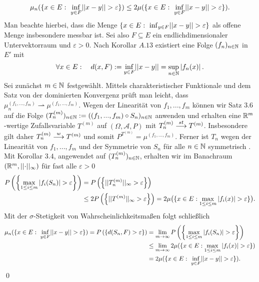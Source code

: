 \begin{proof*}
    $$
        \mu_n(\{x \in E: \ \inf_{y \in F}\lvert\lvert x-y \rvert\rvert > \varepsilon \}) \leq 2 \mu(\{x \in E: \ \inf_{y \in F}\lvert\lvert x-y \rvert\rvert > \varepsilon \}).
    $$
    Man beachte hierbei, dass die Menge $\{x \in E: \ \inf_{y \in F}\lvert\lvert x-y \rvert\rvert > \varepsilon \}$ als offene Menge insbesondere messbar ist. 
    Sei also $F \subseteq E$ ein endlichdimensionaler Untervektorraum und $\varepsilon >0$. Nach Korollar $A.13$ existiert eine Folge $(f_n)_{n \in \mathbb{N}}$ in $E'$ mit 
    $$
        \forall x \in E: \quad d(x,F) := \inf_{y \in F}\lvert\lvert x-y \rvert\rvert = \sup_{n \in \mathbb{N}}\left| f_n(x) \right|. 
    $$
    Sei zunächst $m \in \mathbb{N}$ festgewählt. Mittels charakteristischer Funktionale und dem Satz von der dominierten Konvergenz prüft man leicht, dass $\mu_n^{(f_1,...,f_m)} \rightharpoonup \mu^{(f_1,...,f_m)}$. 
    Wegen der Linearität von $f_1,...,f_m$ können wir Satz $3.6$ auf die Folge $(T_n^{(m)})_{n \in \mathbb{N}} := ((f_1,...,f_m)\circ S_n)_{n \in \mathbb{N}}$ anwenden und erhalten eine $\mathbb{R}^m$-wertige Zufallsvariable $T^{(m)}$ auf $(\Omega, \mathcal{A}, P)$ mit 
    $T_n^{(m)} \overset{st}{\longrightarrow} T^{(m)}$. Insbesondere gilt daher $T_n^{(m)} \overset{w}{\longrightarrow} T^{(m)}$ und somit \mbox{$P^{T^{(m)}} = \mu^{(f_1,...,f_m)}$}. 
    Ferner ist $T_n$ wegen der Linearität von $f_1,...,f_m$ und der Symmetrie von $S_n$ für alle $n \in \mathbb{N}$ symmetrisch . Mit Korollar $3.4$, angewendet auf $(T_n^{(m)})_{n \in \mathbb{N}}$, erhalten wir im Banachraum $(\mathbb{R}^m, \lvert\lvert \cdot \rvert\rvert_{\infty})$ für fast alle $\varepsilon >0$
    \begin{align*}
        P\left(\left\{ \max_{1 \leq i \leq m}\left| f_i(S_n) \right| > \varepsilon \right\}\right) &= P\left(\left\{ \lvert\lvert T_n^{(m)} \rvert\rvert_{\infty} > \varepsilon \right\}\right) \\\
                                                                  &\leq 2 P\left(\left\{ \lvert\lvert T^{(m)} \rvert\rvert_{\infty} > \varepsilon \right\}\right) = 2\mu\big(\{x \in E: \max_{1\leq i \leq m}\left| f_i(x) \right| > \varepsilon\}\big).
    \end{align*}
    Mit der $\sigma$-Stetigkeit von Wahrscheinlichkeitsmaßen folgt schließlich
    \begin{align*}
        \mu_n(\{x \in E: \ \inf_{y \in F}\lvert\lvert x-y \rvert\rvert > \varepsilon \}) = P\left(\left\{ d(S_n, F) > \varepsilon \right\}\right)
                                                                     &= \lim_{m \to \infty}P\left(\left\{ \max_{1 \leq i \leq m}\left| f_i(S_n) \right| > \varepsilon \right\}\right) \\\
                                                                    &\leq \lim_{m \to \infty} 2 \mu(\{x \in E: \max_{1\leq i \leq m}\left| f_i(x) \right| > \varepsilon\}) \\\
                                                                    &= 2 \mu(\{x \in E: \ \inf_{y \in F}\lvert\lvert x-y \rvert\rvert > \varepsilon \}).
    \end{align*}
    \qed
\end{proof*}

